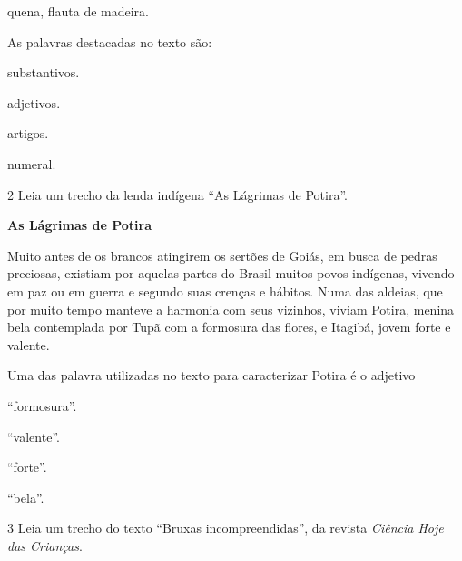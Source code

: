 \begin{conteudo}
\begin{conteudo}
\begin{conteudo}
\begin{conteudo}
\begin{conteudo}
\begin{myquote}
\begin{small}
 quena, flauta de madeira.
\end{small}
\end{myquote}

As palavras destacadas no texto são:

\begin{escolha}
\item substantivos.

\item adjetivos.

\item artigos.

\item numeral.
\end{escolha}

\num{2} Leia um trecho da lenda indígena ``As Lágrimas de Potira''.

\begin{myquote}
\textbf{As Lágrimas de Potira}

Muito antes de os brancos atingirem os sertões de Goiás, em busca de
pedras preciosas, existiam por aquelas partes do Brasil muitos povos
indígenas, vivendo em paz ou em guerra e segundo suas crenças e hábitos.
Numa das aldeias, que por muito tempo manteve a harmonia com seus
vizinhos, viviam Potira, menina bela contemplada por Tupã com a formosura das
flores, e Itagibá, jovem forte e valente. 

\end{myquote}

Uma das palavra utilizadas no texto para caracterizar Potira é o adjetivo

\begin{escolha}
\item ``formosura''.

\item ``valente''.

\item ``forte''.

\item ``bela''.
\end{escolha}

\pagebreak
\num{3} Leia um trecho do texto ``Bruxas incompreendidas'',
da revista \textit{Ciência Hoje das Crianças}.


\end{conteudo}
\end{conteudo}
\end{conteudo}
\end{conteudo}
\end{conteudo}
